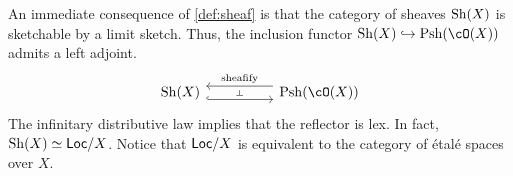 \documentclass[article,10pt,oneside]{memoir}
\begin{document}
An immediate consequence of \cref{def:sheaf} is that the category of sheaves $\operatorname{Sh}(X)$ is sketchable by a limit sketch.
Thus, the inclusion functor $\Sh(X) \into \Psh(\cO(X))$ admits a left adjoint.
\[\begin{tikzcd}
    {\Sh(X)} && {\Psh(\cO(X))}
    \arrow[""{name=0, anchor=center, inner sep=0}, shift right=2, hook, from=1-1, to=1-3]
    \arrow[""{name=1, anchor=center, inner sep=0}, "{\text{sheafify}}"', shift right=2, from=1-3, to=1-1]
    \arrow["\dashv"{anchor=center, rotate=-90}, draw=none, from=1, to=0]
  \end{tikzcd}\]
The infinitary distributive law implies that the reflector is lex.
In fact, $\operatorname{Sh}(X) \simeq \mathsf{Loc}/X$.
Notice that $\mathsf{Loc}/X$ is equivalent to the category of \'etal\'e spaces over $X$.




\end{document}
